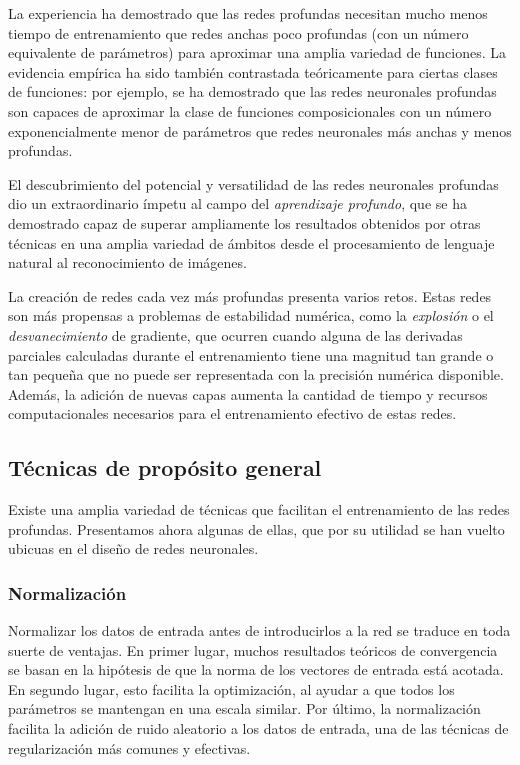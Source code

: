 La experiencia ha demostrado que las redes profundas necesitan mucho menos tiempo de entrenamiento que redes anchas poco profundas (con un número equivalente de parámetros) para aproximar una amplia variedad de funciones. La evidencia empírica ha sido también contrastada teóricamente para ciertas clases de funciones: por ejemplo, se ha demostrado que las redes neuronales profundas son capaces de aproximar la clase de funciones composicionales con un número exponencialmente menor de parámetros \cite{mhaskar2017and} que redes neuronales más anchas y menos profundas. 

El descubrimiento del potencial y versatilidad de las redes neuronales profundas dio un extraordinario ímpetu al campo del \textit{aprendizaje profundo}, que se ha demostrado capaz de superar ampliamente los resultados obtenidos por otras técnicas en una amplia variedad de ámbitos desde el procesamiento de lenguaje natural al reconocimiento de imágenes.

La creación de redes cada vez más profundas presenta varios retos. Estas redes son más propensas a problemas de estabilidad numérica, como la \textit{explosión} o el \textit{desvanecimiento} de gradiente, que ocurren cuando alguna de las derivadas parciales calculadas durante el entrenamiento tiene una magnitud tan grande o tan pequeña que no puede ser representada con la precisión numérica disponible. Además, la adición de nuevas capas aumenta la cantidad de tiempo y recursos computacionales necesarios para el entrenamiento efectivo de estas redes. 

\subsection{Técnicas de propósito general}
Existe una amplia variedad de técnicas que facilitan el entrenamiento de las redes profundas. Presentamos ahora algunas de ellas, que por su utilidad se han vuelto ubicuas en el diseño de redes neuronales.  

\subsubsection{Normalización}
Normalizar los datos de entrada antes de introducirlos a la red se traduce en toda suerte de ventajas. En primer lugar, muchos resultados teóricos de convergencia se basan en la hipótesis de que la norma de los vectores de entrada está acotada. En segundo lugar, esto facilita la optimización, al ayudar a que todos los parámetros se mantengan en una escala similar. Por último, la normalización facilita la adición de ruido aleatorio a los datos de entrada, una de las técnicas de regularización más comunes y efectivas. 


